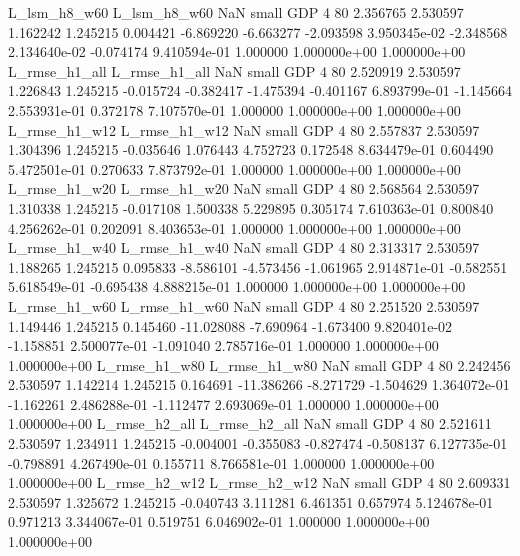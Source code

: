   L_lsm_h8_w60   L_lsm_h8_w60                   NaN      small      GDP                 4 80 2.356765       2.530597 1.162242       1.245215    0.004421     -6.869220     -6.663277    -2.093598   3.950345e-02 -2.348568 2.134640e-02    -0.074174   9.410594e-01            1.000000    1.000000e+00        1.000000e+00
 L_rmse_h1_all  L_rmse_h1_all                   NaN      small      GDP                 4 80 2.520919       2.530597 1.226843       1.245215   -0.015724     -0.382417     -1.475394    -0.401167   6.893799e-01 -1.145664 2.553931e-01     0.372178   7.107570e-01            1.000000    1.000000e+00        1.000000e+00
 L_rmse_h1_w12  L_rmse_h1_w12                   NaN      small      GDP                 4 80 2.557837       2.530597 1.304396       1.245215   -0.035646      1.076443      4.752723     0.172548   8.634479e-01  0.604490 5.472501e-01     0.270633   7.873792e-01            1.000000    1.000000e+00        1.000000e+00
 L_rmse_h1_w20  L_rmse_h1_w20                   NaN      small      GDP                 4 80 2.568564       2.530597 1.310338       1.245215   -0.017108      1.500338      5.229895     0.305174   7.610363e-01  0.800840 4.256262e-01     0.202091   8.403653e-01            1.000000    1.000000e+00        1.000000e+00
 L_rmse_h1_w40  L_rmse_h1_w40                   NaN      small      GDP                 4 80 2.313317       2.530597 1.188265       1.245215    0.095833     -8.586101     -4.573456    -1.061965   2.914871e-01 -0.582551 5.618549e-01    -0.695438   4.888215e-01            1.000000    1.000000e+00        1.000000e+00
 L_rmse_h1_w60  L_rmse_h1_w60                   NaN      small      GDP                 4 80 2.251520       2.530597 1.149446       1.245215    0.145460    -11.028088     -7.690964    -1.673400   9.820401e-02 -1.158851 2.500077e-01    -1.091040   2.785716e-01            1.000000    1.000000e+00        1.000000e+00
 L_rmse_h1_w80  L_rmse_h1_w80                   NaN      small      GDP                 4 80 2.242456       2.530597 1.142214       1.245215    0.164691    -11.386266     -8.271729    -1.504629   1.364072e-01 -1.162261 2.486288e-01    -1.112477   2.693069e-01            1.000000    1.000000e+00        1.000000e+00
 L_rmse_h2_all  L_rmse_h2_all                   NaN      small      GDP                 4 80 2.521611       2.530597 1.234911       1.245215   -0.004001     -0.355083     -0.827474    -0.508137   6.127735e-01 -0.798891 4.267490e-01     0.155711   8.766581e-01            1.000000    1.000000e+00        1.000000e+00
 L_rmse_h2_w12  L_rmse_h2_w12                   NaN      small      GDP                 4 80 2.609331       2.530597 1.325672       1.245215   -0.040743      3.111281      6.461351     0.657974   5.124678e-01  0.971213 3.344067e-01     0.519751   6.046902e-01            1.000000    1.000000e+00        1.000000e+00
